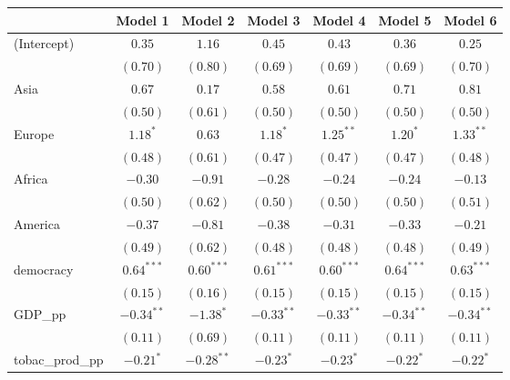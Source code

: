
\begin{table}[!h]
\begin{center}
\begin{tabular}{l c c c c c c }
\toprule
 & Model 1 & Model 2 & Model 3 & Model 4 & Model 5 & Model 6 \\
\midrule
(Intercept)             & $0.35$       & $1.16$       & $0.45$       & $0.43$       & $0.36$       & $0.25$       \\
                        & $(0.70)$     & $(0.80)$     & $(0.69)$     & $(0.69)$     & $(0.69)$     & $(0.70)$     \\
Asia                    & $0.67$       & $0.17$       & $0.58$       & $0.61$       & $0.71$       & $0.81$       \\
                        & $(0.50)$     & $(0.61)$     & $(0.50)$     & $(0.50)$     & $(0.50)$     & $(0.50)$     \\
Europe                  & $1.18^{*}$   & $0.63$       & $1.18^{*}$   & $1.25^{**}$  & $1.20^{*}$   & $1.33^{**}$  \\
                        & $(0.48)$     & $(0.61)$     & $(0.47)$     & $(0.47)$     & $(0.47)$     & $(0.48)$     \\
Africa                  & $-0.30$      & $-0.91$      & $-0.28$      & $-0.24$      & $-0.24$      & $-0.13$      \\
                        & $(0.50)$     & $(0.62)$     & $(0.50)$     & $(0.50)$     & $(0.50)$     & $(0.51)$     \\
America                 & $-0.37$      & $-0.81$      & $-0.38$      & $-0.31$      & $-0.33$      & $-0.21$      \\
                        & $(0.49)$     & $(0.62)$     & $(0.48)$     & $(0.48)$     & $(0.48)$     & $(0.49)$     \\
democracy               & $0.64^{***}$ & $0.60^{***}$ & $0.61^{***}$ & $0.60^{***}$ & $0.64^{***}$ & $0.63^{***}$ \\
                        & $(0.15)$     & $(0.16)$     & $(0.15)$     & $(0.15)$     & $(0.15)$     & $(0.15)$     \\
GDP\_pp                 & $-0.34^{**}$ & $-1.38^{*}$  & $-0.33^{**}$ & $-0.33^{**}$ & $-0.34^{**}$ & $-0.34^{**}$ \\
                        & $(0.11)$     & $(0.69)$     & $(0.11)$     & $(0.11)$     & $(0.11)$     & $(0.11)$     \\
tobac\_prod\_pp         & $-0.21^{*}$  & $-0.28^{**}$ & $-0.23^{*}$  & $-0.23^{*}$  & $-0.22^{*}$  & $-0.22^{*}$  \\

\end{tabular}
\end{center}
\end{table}
